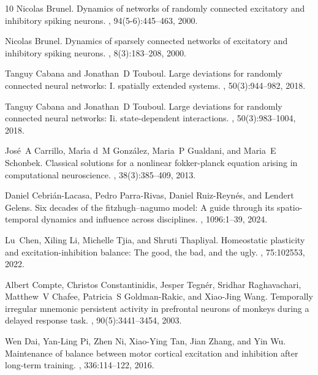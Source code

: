 \documentclass[onefignum,onetabnum]{siamart190516}
\newcommand{\1}{\mathbbm{1}}
\begin{document}
\begin{thebibliography}{10}
Nicolas Brunel.
\newblock Dynamics of networks of randomly connected excitatory and inhibitory
  spiking neurons.
, 94(5-6):445--463, 2000.

Nicolas Brunel.
\newblock Dynamics of sparsely connected networks of excitatory and inhibitory
  spiking neurons.
, 8(3):183--208, 2000.

Tanguy Cabana and Jonathan~D Touboul.
\newblock Large deviations for randomly connected neural networks: I. spatially
  extended systems.
, 50(3):944--982, 2018.

Tanguy Cabana and Jonathan~D Touboul.
\newblock Large deviations for randomly connected neural networks: Ii.
  state-dependent interactions.
, 50(3):983--1004, 2018.

Jos{\'e}~A Carrillo, Mar{\'\i}a d~M Gonz{\'a}lez, Maria~P Gualdani, and Maria~E
  Schonbek.
\newblock Classical solutions for a nonlinear fokker-planck equation arising in
  computational neuroscience.
,
  38(3):385--409, 2013.

Daniel Cebri{\'a}n-Lacasa, Pedro Parra-Rivas, Daniel Ruiz-Reyn{\'e}s, and
  Lendert Gelens.
\newblock Six decades of the fitzhugh--nagumo model: A guide through its
  spatio-temporal dynamics and influence across disciplines.
, 1096:1--39, 2024.

Lu~Chen, Xiling Li, Michelle Tjia, and Shruti Thapliyal.
\newblock Homeostatic plasticity and excitation-inhibition balance: The good,
  the bad, and the ugly.
, 75:102553, 2022.

Albert Compte, Christos Constantinidis, Jesper Tegn{\'e}r, Sridhar
  Raghavachari, Matthew~V Chafee, Patricia~S Goldman-Rakic, and Xiao-Jing Wang.
\newblock Temporally irregular mnemonic persistent activity in prefrontal
  neurons of monkeys during a delayed response task.
, 90(5):3441--3454, 2003.

Wen Dai, Yan-Ling Pi, Zhen Ni, Xiao-Ying Tan, Jian Zhang, and Yin Wu.
\newblock Maintenance of balance between motor cortical excitation and
  inhibition after long-term training.
, 336:114--122, 2016.


\end{thebibliography}
\end{document}
